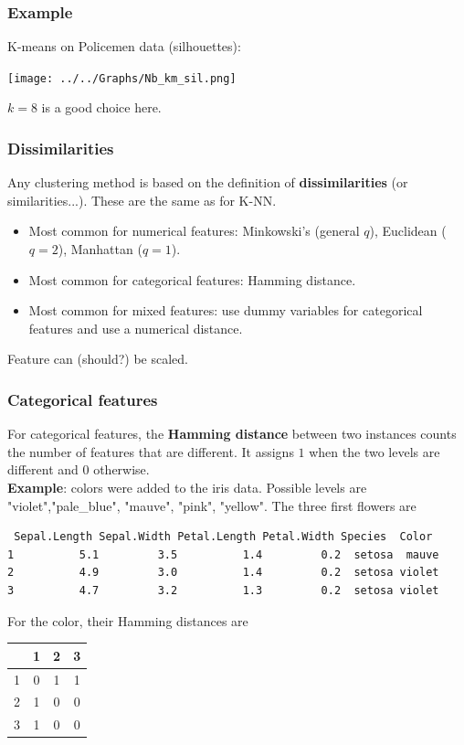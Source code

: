 


\begin{frame}
\frametitle{Example}
K-means on Policemen data (silhouettes):
\begin{center}
\texttt{[image: ../../Graphs/Nb\_km\_sil.png]}
\end{center}
$k=8$ is a good choice here.
\end{frame}
\begin{frame}
\frametitle{Dissimilarities}
Any clustering method is based on the definition of {\bf dissimilarities} (or similarities...). These are the same as for K-NN.
\begin{itemize}
\item Most common for numerical features: Minkowski's (general $q$), Euclidean ($q=2$), Manhattan ($q=1$).
\item Most common for categorical features: Hamming distance.
\item Most common for mixed features: use dummy variables for categorical features and use a numerical distance.
\end{itemize}
Feature can (should?) be scaled.
\end{frame}
\begin{frame}[fragile]
\frametitle{Categorical features}
For categorical features, the {\bf Hamming distance} between two instances counts the number of features that are different. It assigns $1$ when the two levels are different and $0$ otherwise.\\
\vspace{0.2cm}
{\bf Example}: colors were added to the iris data. Possible levels are "violet","pale\_blue", "mauve", "pink", "yellow". The three first flowers are\\
\scriptsize
\begin{verbatim}
 Sepal.Length Sepal.Width Petal.Length Petal.Width Species  Color
1          5.1         3.5          1.4         0.2  setosa  mauve
2          4.9         3.0          1.4         0.2  setosa violet
3          4.7         3.2          1.3         0.2  setosa violet
\end{verbatim}
\normalsize
For the color, their Hamming distances are\\
\scriptsize
\begin{center}
\begin{tabular}{c|ccc}
 & 1& 2& 3\\
\hline
1 &0 &1 &1\\
2& 1& 0& 0\\
3& 1& 0& 0
\end{tabular}
\end{center}
\normalsize
\end{frame}
